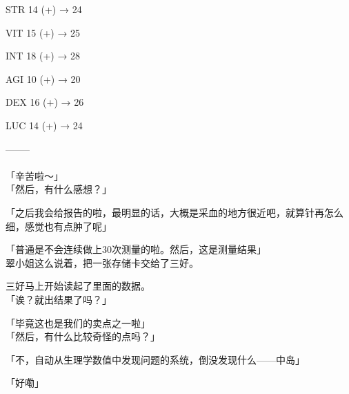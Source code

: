   STR 14 (+) → 24

  VIT 15 (+) → 25

  INT 18 (+) → 28

  AGI 10 (+) → 20

  DEX 16 (+) → 26

  LUC 14 (+) → 24

  --------\\

\sqsplit\\

「辛苦啦～」\\

「然后，有什么感想？」

「之后我会给报告的啦，最明显的话，大概是采血的地方很近吧，就算针再怎么细，感觉也有点肿了呢」

「普通是不会连续做上30次测量的啦。然后，这是测量结果」\\

翠小姐这么说着，把一张存储卡交给了三好。

三好马上开始读起了里面的数据。\\

「诶？就出结果了吗？」

「毕竟这也是我们的卖点之一啦」\\

「然后，有什么比较奇怪的点吗？」

「不，自动从生理学数值中发现问题的系统，倒没发现什么——中岛」

「好嘞」\\

